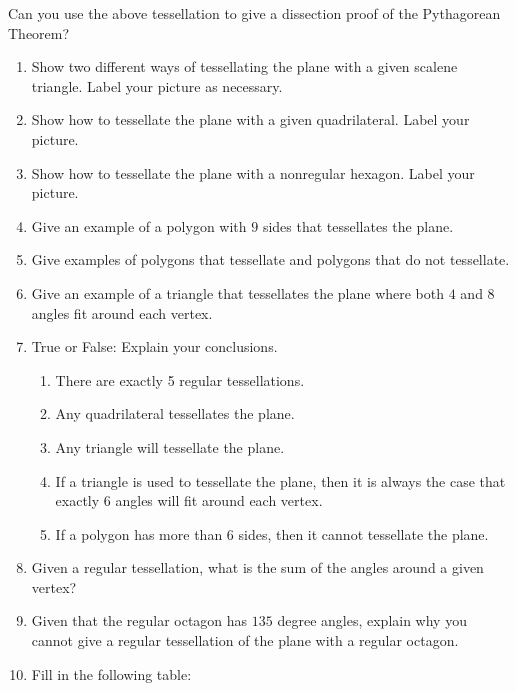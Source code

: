 \begin{ques} Can you use the above tessellation to give a dissection proof of the Pythagorean Theorem?
\end{ques}
\QM








\newpage

\problems
\begin{enumerate}
\item Show two different ways of tessellating the plane with a given scalene triangle. Label your picture as necessary.
\item Show how to tessellate the plane with a given quadrilateral. Label your picture.
\item Show how to tessellate the plane with a nonregular hexagon. Label your picture.
\item Give an example of a polygon with $9$ sides that tessellates the plane.
\item Give examples of polygons that tessellate and polygons that do
  not tessellate.
\item Give an example of a triangle that tessellates the plane where
  both $4$ and $8$ angles fit around each vertex.
\item True or False: Explain your conclusions.
\begin{enumerate}
\item There are exactly 5 regular tessellations.
\item Any quadrilateral tessellates the plane.
\item Any triangle will tessellate the plane.
\item If a triangle is used to tessellate the plane, then it is always
  the case that exactly $6$ angles will fit around each vertex.
\item If a polygon has more than 6 sides, then it cannot tessellate the plane.
\end{enumerate}
\item Given a regular tessellation, what is the sum of the angles
  around a given vertex?
\item Given that the regular octagon has $135$ degree angles, explain
  why you cannot give a regular tessellation of the plane with a
  regular octagon.
\item \label{tesstable} Fill in the following table:
\begin{center}
\begin{tabular}{|c || c| c| c|}\hline

\end{tabular}
\end{center}
\end{enumerate}
